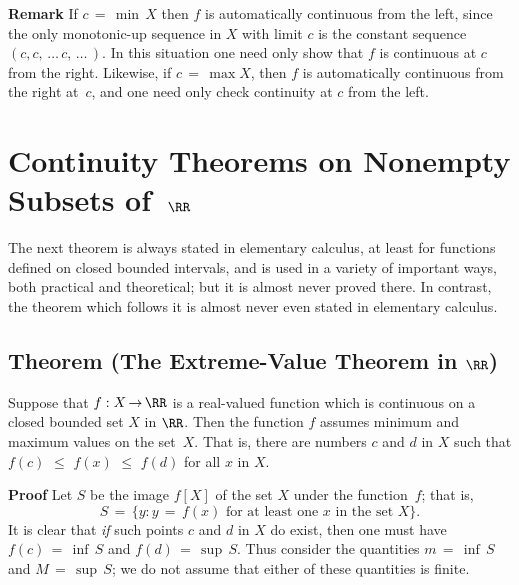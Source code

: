 \V

        {\bf Remark} If $c \,=\, {\min}\,X$ then $f$ is automatically continuous from the left,
    since the only monotonic-up sequence in $X$ with limit $c$ is the constant sequence $(c,c,\,{\ldots}\,c,\,{\ldots}\,)$.
    In this situation one need only show that $f$ is continuous at $c$ from the right.
    Likewise, if $c \,=\, \max X$, then $f$ is automatically continuous from the right at~$c$, and one need only check continuity at $c$ from the left.

\VV


                \section{{\bf Continuity Theorems on Nonempty Subsets of~${\RR}$}}
                \label{SectD30}

\VV

        The next theorem is always stated in elementary calculus, at least for functions defined on closed bounded intervals,
    and is used in a variety of important ways, both practical and theoretical; but it is almost never proved there.
    In contrast, the theorem which follows it is almost never even stated in elementary calculus.

\VV


        \subsection{\small{\bf Theorem} (The Extreme-Value Theorem in ${\RR}$)}
            \label{ThmD30.10}

\V

        Suppose that $f:X \,{\rightarrow}\, {\RR}$ is a real-valued function which is continuous on a closed bounded set $X$ in ${\RR}$.
    Then the function $f$ assumes minimum and maximum values on the set~$X$. That is, there are numbers $c$ and $d$ in $X$ such that 
    $f(c)\,\,{\leq}\,\,f(x)\,\,{\leq}\,\,f(d)$ for all $x$ in $X$.

\V

        {\bf Proof} Let $S$ be the image $f[X]$ of the set $X$ under the function~$f$; that is,
        \begin{displaymath}
        S \,=\, \{y: y \,=\, f(x) \mbox{ for at least one $x$ in the set~$X$}\}.
        \end{displaymath}
     It is clear that {\em if} such points $c$ and $d$ in $X$ do exist,
    then one must have $f(c) \,=\, {\inf}\,S$ and $f(d) \,=\, {\sup}\,S$. Thus consider the quantities $m \,=\, {\inf}\,S$ and $M \,=\, {\sup}\,S$;
    we do not assume that either of these quantities is finite.


